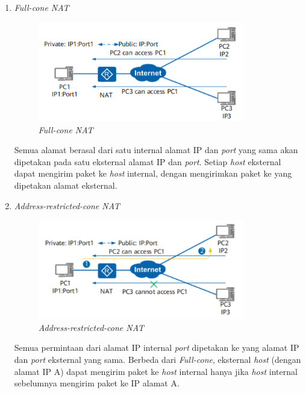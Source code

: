 \begin{enumerate}
  \item{\emph{Full-cone NAT}}
  \begin{figure}[H]
    \centering{}
    \includegraphics[width=0.85\textwidth]{gambar/full_cone_nat}
    \caption{\emph{Full-cone NAT}}
  \end{figure}

  Semua alamat berasal dari satu internal alamat IP dan \emph{port} yang sama akan dipetakan pada satu eksternal alamat IP dan \emph{port}. Setiap \emph{host} eksternal dapat mengirim paket ke \emph{host} internal, dengan mengirimkan paket ke yang dipetakan alamat eksternal.
  
  \break
  \item{\emph{Address-restricted-cone NAT}}
  \begin{figure}[H]
    \centering{}
    \includegraphics[width=0.85\textwidth]{gambar/address_restricted_cone_nat}
    \caption{\emph{Address-restricted-cone NAT}}
  \end{figure}

  Semua permintaan dari alamat IP internal \emph{port} dipetakan ke yang alamat IP dan \emph{port} eksternal yang sama. Berbeda dari \emph{Full-cone}, eksternal \emph{host} (dengan alamat IP A) dapat mengirim paket ke \emph{host} internal hanya jika \emph{host} internal sebelumnya mengirim paket ke IP alamat A.


\end{enumerate}

